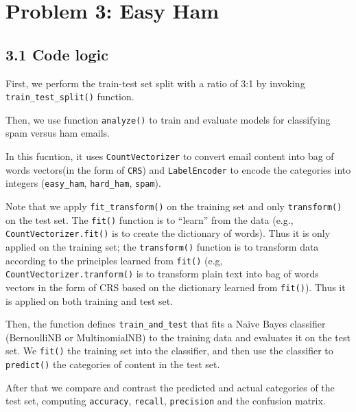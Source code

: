 \documentclass[11pt]{article}
\begin{document}
    \hypertarget{problem-3-easy-ham}{%
\section{Problem 3: Easy Ham}\label{problem-3-easy-ham}}

\hypertarget{code-logic}{%
\subsection{3.1 Code logic}\label{code-logic}}

First, we perform the train-test set split with a ratio of 3:1 by
invoking \texttt{train\_test\_split()} function.

Then, we use function \texttt{analyze()} to train and evaluate models
for classifying spam versus ham emails.

In this fucntion, it uses \texttt{CountVectorizer} to convert email
content into bag of words vectors(in the form of \texttt{CRS}) and
\texttt{LabelEncoder} to encode the categories into integers
(\texttt{easy\_ham}, \texttt{hard\_ham}, \texttt{spam}).

Note that we apply \texttt{fit\_transform()} on the training set and
only \texttt{transform()} on the test set. The \texttt{fit()} function
is to ``learn'' from the data (e.g., \texttt{CountVectorizer.fit()} is
to create the dictionary of words). Thus it is only applied on the
training set; the \texttt{transform()} function is to transform data
according to the principles learned from \texttt{fit()} (e.g,
\texttt{CountVectorizer.tranform()} is to transform plain text into bag
of words vectors in the form of CRS based on the dictionary learned from
\texttt{fit()}). Thus it is applied on both training and test set.

Then, the function defines \texttt{train\_and\_test} that fits a Naive
Bayes classifier (BernoulliNB or MultinomialNB) to the training data and
evaluates it on the test set. We \texttt{fit()} the training set into
the classifier, and then use the classifier to \texttt{predict()} the
categories of content in the test set.

After that we compare and contrast the predicted and actual categories
of the test set, computing \texttt{accuracy}, \texttt{recall},
\texttt{precision} and the confusion matrix.
\end{document}
